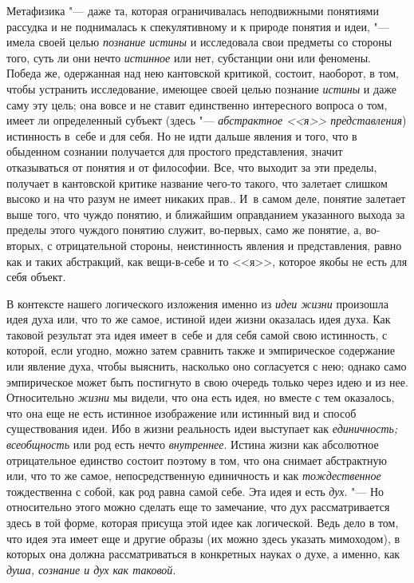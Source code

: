 Метафизика "--- даже та, которая ограничивалась
неподвижными понятиями рассудка и не поднималась к спекулятивному и к
природе понятия и идеи, "--- имела своей целью {\em познание истины} и
исследовала свои предметы со стороны того, суть ли они нечто
{\em истинное} или нет,
субстанции они или феномены. Победа же, одержанная над нею кантовской
критикой, состоит, наоборот, в том, чтобы устранить исследование, имеющее
своей целью познание {\em истины}
и даже саму эту цель; она вовсе и не ставит единственно
интересного вопроса о том, имеет ли определенный субъект (здесь
"--- {\em абстрактное <<я>> представления})
истинность в~себе и для себя. Но не идти дальше явления и
того, что в обыденном сознании получается для простого представления,
значит отказываться от понятия и от философии. Все, что выходит за эти
пределы, получает в кантовской критике название чего-то такого, что
залетает слишком высоко и на что разум не имеет никаких прав.. И~в самом
деле, понятие залетает выше того, что чуждо понятию, и ближайшим
оправданием указанного выхода за пределы этого чуждого понятию служит,
во-первых, само же понятие, а, во-вторых, с отрицательной
стороны, неистинность явления и представления, равно как и таких
абстракций, как вещи-в-себе и то <<я>>, которое якобы не есть для себя
объект.

В контексте нашего логического изложения именно из
{\em идеи жизни}
произошла идея духа или, что то же самое, истиной идеи жизни
оказалась идея духа. Как таковой результат эта идея имеет в~себе и для себя
самой свою истинность, с которой, если угодно, можно затем сравнить также и
эмпирическое содержание или явление духа, чтобы выяснить, насколько оно
согласуется с нею; однако само эмпирическое может быть постигнуто в свою
очередь только через идею и из нее. Относительно {\em жизни} мы видели,
что она есть идея, но вместе с тем оказалось, что она еще не есть истинное
изображение или истинный вид и способ существования идеи. Ибо в жизни
реальность идеи выступает как {\em единичность;} {\em всеобщность} или род
есть нечто {\em внутреннее}.
Истина жизни как абсолютное отрицательное единство состоит
поэтому в том, что она снимает абстрактную или, что то же самое,
непосредственную единичность и как {\em тождественное}
тождественна с собой, как род равна самой себе. Эта идея и
есть {\em дух}. "--- Но
относительно этого можно сделать еще то замечание, что дух рассматривается
здесь в той форме, которая присуща этой идее как логической. Ведь дело в
том, что идея эта имеет еще и другие образы (их можно здесь указать
мимоходом), в которых она должна рассматриваться в конкретных науках о
духе, а именно, как {\em душа, сознание и дух как таковой}.

